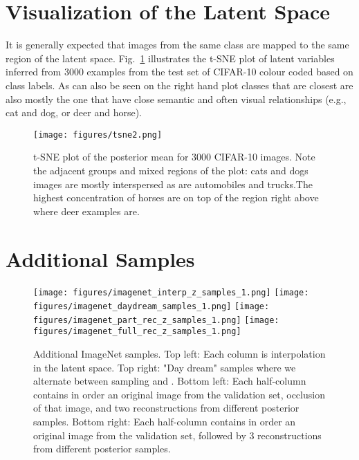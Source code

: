 \documentclass{article} \usepackage{iclr2019_conference,times}
\def\figref#1{figure~\ref{#1}}
\renewcommand{\figref}[1]{Fig.~\ref{#1}}
\begin{document}
\section{Visualization of the Latent Space}
It is generally expected that images from the same class are mapped to the same region of the latent space. \figref{fig:tsne} illustrates the t-SNE \citep{TSNE} plot of latent variables inferred from 3000 examples from the test set of CIFAR-10 colour coded based on class labels. As can also be seen on the right hand plot classes that are closest are also mostly the one that have close semantic and often visual relationships (e.g., cat and dog, or deer and horse). 

\begin{figure}[h!]
    \centering
    \texttt{[image: figures/tsne2.png]}
    \caption{t-SNE plot of the posterior mean for 3000 CIFAR-10 images. Note the adjacent groups and mixed regions of the plot: cats and dogs images are mostly interspersed as are automobiles and trucks.The highest concentration of horses are on top of the region right above where deer examples are.
    }
    \label{fig:tsne}    
\end{figure}

\section{Additional Samples}\label{app:samples}


\begin{figure}[h!]
    \centering
    \texttt{[image: figures/imagenet\_interp\_z\_samples\_1.png]}
    \texttt{[image: figures/imagenet\_daydream\_samples\_1.png]}
    \texttt{[image: figures/imagenet\_part\_rec\_z\_samples\_1.png]}
    \texttt{[image: figures/imagenet\_full\_rec\_z\_samples\_1.png]}
    \label{fig:more-imagenet-samez}
    \caption{Additional ImageNet samples. Top left: Each column is interpolation in the latent space.
     Top right: "Day dream" samples where we alternate between sampling  and .
     Bottom left: Each half-column contains in order an original image from the validation set, occlusion of
     that image, and two reconstructions from different posterior samples.
     Bottom right: Each half-column contains in order an original image from the validation set, followed by 3
     reconstructions from different posterior samples.}
\end{figure}
\end{document}
